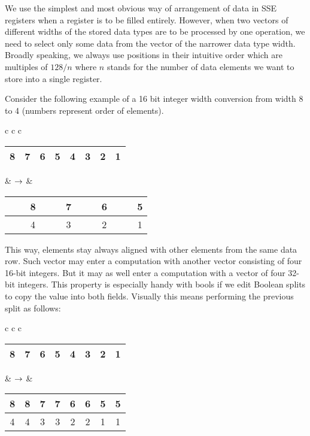 We use the simplest and most obvious way of arrangement of data in SSE registers when a register is to be filled entirely. However, when two vectors of different widths of the stored data types are to be processed by one operation, we need to select only some data from the vector of the narrower data type width. Broadly speaking, we always use positions in their intuitive order which are multiples of $128/n$ where $n$ stands for the number of data elements we want to store into a single register. 

Consider the following example of a 16 bit integer width conversion from width 8 to 4 (numbers represent order of elements).


\mybeginfig
\begin{longtable}{ c c c }
  {
\begin{tabular}{|c|c|c|c|c|c|c|c|}
\hline
8 & 7 & 6 & 5 & 4 & 3 & 2 & 1 \tabularnewline
\hline
\end{tabular}
}
&
$\rightarrow$
&
  {
\begin{tabular}{|c|c|c|c|c|c|c|c|}
\hline
\ \ & 8 & \ \ & 7 & \ \ & 6 & \ \ & 5 \tabularnewline
\hline
\ \ & 4 & \ \ & 3 & \ \ & 2 & \ \ & 1 \tabularnewline
\hline
\end{tabular}
}
\end{longtable}

This way, elements stay always aligned with other elements from the same data row. Such vector may enter a computation with another vector consisting of four 16-bit integers. But it may as well enter a computation with a vector of four 32-bit integers. This property is especially handy with bools if we edit Boolean splits to copy the value into both fields. Visually this means performing the previous split as follows:

\mybeginfig
\begin{longtable}{ c c c }
\begin{tabular}{|c|c|c|c|c|c|c|c|}
\hline
8 & 7 & 6 & 5 & 4 & 3 & 2 & 1 \tabularnewline
\hline
\end{tabular}
&
$\rightarrow$
&
\begin{tabular}{|c|c|c|c|c|c|c|c|}
\hline
8 & 8 & 7 & 7 & 6 & 6 & 5 & 5 \tabularnewline
\hline
4  & 4 & 3 & 3 & 2 & 2 & 1 & 1 \tabularnewline
\hline
\end{tabular}
\end{longtable}

